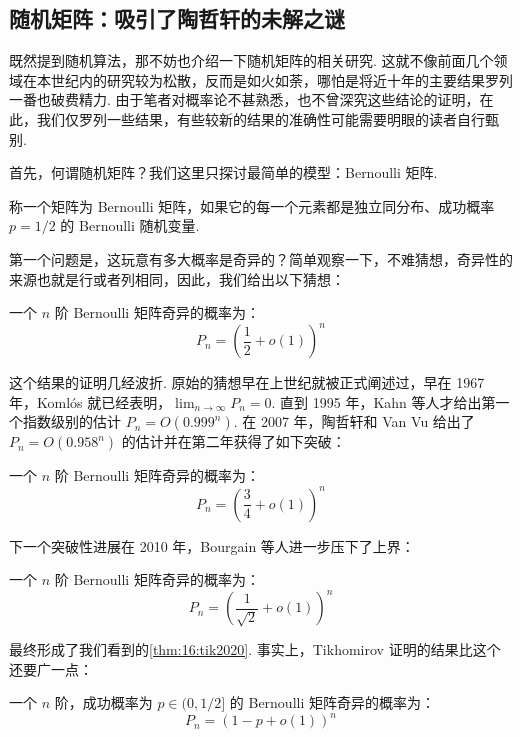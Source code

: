 \subsection{随机矩阵：吸引了陶哲轩的未解之谜}

既然提到随机算法，那不妨也介绍一下随机矩阵的相关研究. 这就不像前面几个领域在本世纪内的研究较为松散，反而是如火如荼，哪怕是将近十年的主要结果罗列一番也破费精力. 由于笔者对概率论不甚熟悉，也不曾深究这些结论的证明，在此，我们仅罗列一些结果，有些较新的结果的准确性可能需要明眼的读者自行甄别.

首先，何谓随机矩阵？我们这里只探讨最简单的模型：Bernoulli 矩阵.

\begin{definition}
    称一个矩阵为 Bernoulli 矩阵，如果它的每一个元素都是独立同分布、成功概率 $p = 1/2$ 的 Bernoulli 随机变量.
\end{definition}

第一个问题是，这玩意有多大概率是奇异的？简单观察一下，不难猜想，奇异性的来源也就是行或者列相同，因此，我们给出以下猜想：

\begin{theorem}[Tikhomirov, 2020] \label{thm:16:tik2020}
    一个 $n$ 阶 Bernoulli 矩阵奇异的概率为：
    \[ P_n = \left( \frac{1}{2} + o(1) \right)^n \]
\end{theorem}

这个结果的证明几经波折. 原始的猜想早在上世纪就被正式阐述过，早在 1967 年，Koml\'os 就已经表明，$\displaystyle\lim_{n \to \infty} P_n = 0$. 直到 1995 年，Kahn 等人才给出第一个指数级别的估计 $P_n = O(0.999^n)$. 在 2007 年，陶哲轩和 Van Vu 给出了 $P_n = O(0.958^n)$ 的估计并在第二年获得了如下突破：

\begin{theorem}[Tao-Vu, 2007]
    一个 $n$ 阶 Bernoulli 矩阵奇异的概率为：
    \[ P_n = \left( \frac{3}{4} + o(1) \right)^n \]
\end{theorem}

下一个突破性进展在 2010 年，Bourgain 等人进一步压下了上界：

\begin{theorem}[Bourgain, 2010]
    一个 $n$ 阶 Bernoulli 矩阵奇异的概率为：
    \[ P_n = \left( \frac{1}{\sqrt{2}} + o(1) \right)^n \]
\end{theorem}

最终形成了我们看到的\autoref{thm:16:tik2020}. 事实上，Tikhomirov 证明的结果比这个还要广一点：

\begin{theorem}[Tikhomirov, 2020]
    一个 $n$ 阶，成功概率为 $p \in (0, 1/2]$ 的 Bernoulli 矩阵奇异的概率为：
    \[ P_n = \left( 1 - p + o(1) \right)^n \]
\end{theorem}

